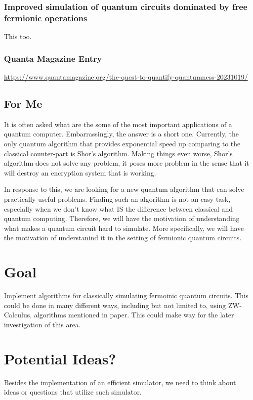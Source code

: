 \documentclass[11pt]{article}
\begin{document}
\subsubsection{Improved simulation of quantum circuits dominated by free fermionic operations}
\label{sec:org08befbe}
This too.
\subsubsection{Quanta Magazine Entry}
\label{sec:org3481684}
\url{https://www.quantamagazine.org/the-quest-to-quantify-quantumness-20231019/}
\subsection{For Me}
\label{sec:org3c28ae9}
It is often asked what are the some of the most important applications of a
quantum computer. Embarrassingly, the answer is a short one. Currently, the only
quantum algorithm that provides exponential speed up comparing to the classical
counter-part is Shor's algorithm. Making things even worse, Shor's algorithm
does not solve any problem, it poses more problem in the sense that it will
destroy an encryption system that is working.

In response to this, we are looking for a new quantum algorithm that can solve
practically useful problems. Finding such an algorithm is not an easy task,
especially when we don't know what IS the difference between classical and
quantum computing. Therefore, we will have the motivation of understanding what
makes a quantum circuit hard to simulate. More specifically, we will have the
motivation of understanind it in the setting of fermionic quantum circuits.
\section{Goal}
\label{sec:org0de3c6c}
Implement algorithms for classically simulating fermoinic quantum circuits. This
could be done in many different ways, including but not limited to, using
ZW-Calculus, algorithms mentioned in paper. This could make way for the later
investigation of this area.
\section{Potential Ideas?}
\label{sec:org4119409}
Besides the implementation of an efficient simulator, we need to think about
ideas or questions that utilize such simulator.
\end{document}
